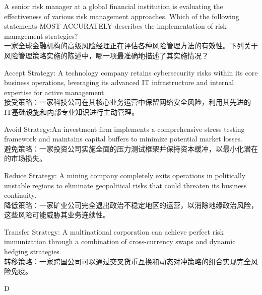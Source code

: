 \documentclass{article}
\newcounter{question} %
\begin{document}
\begin{question}
    A senior risk manager at a global financial institution is evaluating the effectiveness of various risk management approaches. Which of the following statements MOST ACCURATELY describes the implementation of risk management strategies?\\
    一家全球金融机构的高级风险经理正在评估各种风险管理方法的有效性。下列关于风险管理策略实施的陈述中，哪一项最准确地描述了其实施情况？
    \end{question}
    
    \begin{choices}
    \item Accept Strategy: A technology company retains cybersecurity risks within its core business operations, leveraging its advanced IT infrastructure and internal expertise for active management. \\
    接受策略：一家科技公司在其核心业务运营中保留网络安全风险，利用其先进的IT基础设施和内部专业知识进行主动管理。
    
    \item Avoid Strategy:An investment firm implements a comprehensive stress testing framework and maintains capital buffers to minimize potential market losses. \\
    避免策略：一家投资公司实施全面的压力测试框架并保持资本缓冲，以最小化潜在的市场损失。
    
    \item Reduce Strategy: A mining company completely exits operations in politically unstable regions to eliminate geopolitical risks that could threaten its business continuity. \\
    降低策略：一家矿业公司完全退出政治不稳定地区的运营，以消除地缘政治风险，这些风险可能威胁其业务连续性。
    
    \item Transfer Strategy: A multinational corporation can achieve perfect risk immunization through a combination of cross-currency swaps and dynamic hedging strategies. \\
    转移策略：一家跨国公司可以通过交叉货币互换和动态对冲策略的组合实现完全风险免疫。
    \end{choices}
    
    \begin{correctanswer}
    D
    \end{correctanswer}
    
\end{document}
